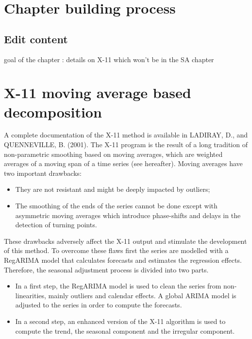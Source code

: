 \documentclass[
  letterpaper,
  DIV=11,
  numbers=noendperiod]{scrreprt}
\begin{document}
\hypertarget{chapter-building-process-3}{%
\section{Chapter building process}\label{chapter-building-process-3}}

\hypertarget{edit-content-3}{%
\subsection{Edit content}\label{edit-content-3}}

goal of the chapter : details on X-11 which won't be in the SA chapter

\hypertarget{x-11-moving-average-based-decomposition}{%
\section{X-11 moving average based
decomposition}\label{x-11-moving-average-based-decomposition}}

A complete documentation of the X-11 method is available in LADIRAY, D.,
and QUENNEVILLE, B. (2001). The X-11 program is the result of a long
tradition of non-parametric smoothing based on moving averages, which
are weighted averages of a moving span of a time series (see hereafter).
Moving averages have two important drawbacks:

\begin{itemize}
\item
  They are not resistant and might be deeply impacted by outliers;
\item
  The smoothing of the ends of the series cannot be done except with
  asymmetric moving averages which introduce phase-shifts and delays in
  the detection of turning points.
\end{itemize}

These drawbacks adversely affect the X-11 output and stimulate the
development of this method. To overcome these flaws first the series are
modelled with a RegARIMA model that calculates forecasts and estimates
the regression effects. Therefore, the seasonal adjustment process is
divided into two parts.

\begin{itemize}
\item
  In a first step, the RegARIMA model is used to clean the series from
  non-linearities, mainly outliers and calendar effects. A global ARIMA
  model is adjusted to the series in order to compute the forecasts.
\item
  In a second step, an enhanced version of the X-11 algorithm is used to
  compute the trend, the seasonal component and the irregular component.
\end{itemize}
\end{document}
